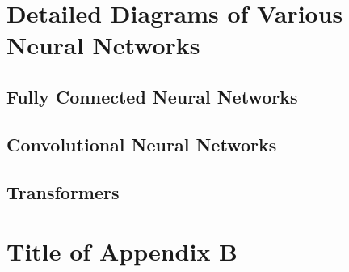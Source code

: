 \chapter{Detailed Diagrams of Various Neural Networks}
\label{chap:NNArch}
\section{Fully Connected Neural Networks}
\label{app:FCN}


\section{Convolutional Neural Networks}
\label{app:CNN}


\section{Transformers}
\label{app:transformers}


\chapter{Title of Appendix B}
